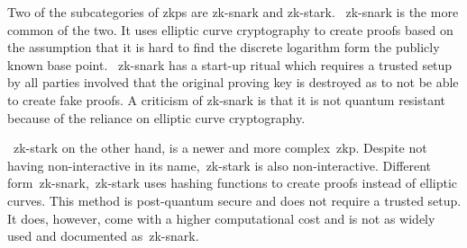 Two of the subcategories of \gls{zkp}s are \gls{zk-snark} and \gls{zk-stark}.
~\gls{zk-snark} is the more common of the two.
It uses elliptic curve cryptography to create proofs based on the assumption that it is hard to find the discrete logarithm form the publicly known base point.
~\gls{zk-snark} has a start-up ritual which requires a trusted setup by all parties involved that the original proving key is destroyed as to not be able to create fake proofs.
A criticism of \gls{zk-snark} is that it is not quantum resistant because of the reliance on elliptic curve cryptography.

~\gls{zk-stark} on the other hand, is a newer and more complex~\gls{zkp}.
Despite not having non-interactive in its name,~\gls{zk-stark} is also non-interactive.
Different form~\gls{zk-snark},~\gls{zk-stark} uses hashing functions to create proofs instead of elliptic curves.
This method is post-quantum secure and does not require a trusted setup.
It does, however, come with a higher computational cost and is not as widely used and documented as~\gls{zk-snark}.
